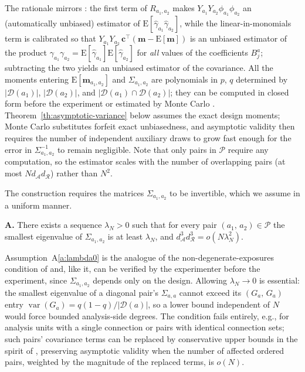 \documentclass[sigconf,anonymous,review]{acmart}
\newcounter{assumption}
\newenvironment{assumption}{\refstepcounter{assumption}\par\medskip\noindent\textbf{A\theassumption.}\enspace}{\par\medskip}
\newcommand{\E}{\mathrm E}
\DeclareMathOperator{\var}{var}
\begin{document}
The rationale mirrors \cite[Section~5.1]{harshaw2023erl}: the first term of $R_{a_1,a_2}$ makes $Y_{a_1}Y_{a_2}\phi_{a_1}\phi_{a_2}$ an (automatically unbiased) estimator of $\E[\hat\gamma_{a_1}\hat\gamma_{a_2}]$, while the linear-in-monomials term is calibrated so that $Y_{a_1}Y_{a_2}\,\mathbf c^{\top}(\mathbf m-\E[\mathbf m])$ is an unbiased estimator of the product $\gamma_{a_1}\gamma_{a_2}=\E[\hat\gamma_{a_1}]\E[\hat\gamma_{a_2}]$ for \emph{all} values of the coefficients $B^a_j$; subtracting the two yields an unbiased estimator of the covariance. All the moments entering $\E[\mathbf m_{a_1,a_2}]$ and $\Sigma_{a_1,a_2}$ are polynomials in $p$, $q$ determined by $|\mathcal D(a_1)|$, $|\mathcal D(a_2)|$, and $|\mathcal D(a_1)\cap\mathcal D(a_2)|$; they can be computed in closed form before the experiment or estimated by Monte Carlo \cite{fattorini2006applying}. Theorem~\ref{th:asymptotic-variance} below assumes the exact design moments; Monte Carlo substitutes forfeit exact unbiasedness, and asymptotic validity then requires the number of independent auxiliary draws to grow fast enough for the error in $\Sigma^{-1}_{a_1,a_2}$ to remain negligible. Note that only pairs in $\mathcal P$ require any computation, so the estimator scales with the number of overlapping pairs (at most $Nd_{\mathcal A}d_{\mathcal R}$) rather than $N^2$.

The construction requires the matrices $\Sigma_{a_1,a_2}$ to be invertible, which we assume in a uniform manner.

\begin{assumption}\label{a:lambda0}
    There exists a sequence $\lambda_N>0$ such that for every pair $(a_1,\,a_2)\in\mathcal P$ the smallest eigenvalue of $\Sigma_{a_1,a_2}$ is at least $\lambda_N$, and $d^{3}_{\mathcal A}d^{3}_{\mathcal R} = o(N\lambda_N^2)$.
\end{assumption}

Assumption~A\ref{a:lambda0} is the analogue of the non-degenerate-exposures condition of \cite[Assumption~4]{harshaw2023erl} and, like it, can be verified by the experimenter before the experiment, since $\Sigma_{a_1,a_2}$ depends only on the design. Allowing $\lambda_N\to0$ is essential: the smallest eigenvalue of a diagonal pair's $\Sigma_{a,a}$ cannot exceed its $(G_a,\,G_a)$ entry $\var(G_a) = q(1-q)/|\mathcal D(a)|$, so a lower bound independent of $N$ would force bounded analysis-side degrees. The condition fails entirely, e.g., for analysis units with a single connection or pairs with identical connection sets; such pairs' covariance terms can be replaced by conservative upper bounds in the spirit of \cite[Proposition~5.2]{harshaw2023erl}, preserving asymptotic validity when the number of affected ordered pairs, weighted by the magnitude of the replaced terms, is $o(N)$.
\end{document}
